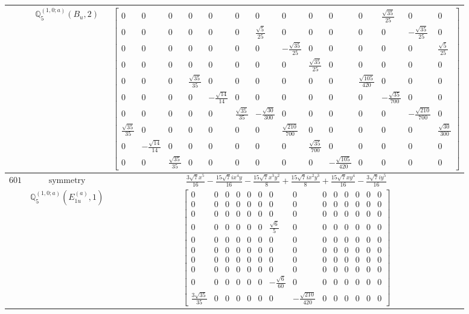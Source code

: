 \documentclass[fleqn,8pt,landscape]{jsarticle}
\begin{document}
\begin{longtable}{ccc}
$  $ & $ \mathbb{Q}_{5}^{(1,0;a)}(B_{u},2) $ & $ \begin{bmatrix} 0 & 0 & 0 & 0 & 0 & 0 & 0 & 0 & 0 & 0 & 0 & \frac{\sqrt{35}}{25} & 0 & 0 \\ 0 & 0 & 0 & 0 & 0 & 0 & \frac{\sqrt{5}}{25} & 0 & 0 & 0 & 0 & 0 & - \frac{\sqrt{35}}{25} & 0 \\ 0 & 0 & 0 & 0 & 0 & 0 & 0 & - \frac{\sqrt{35}}{25} & 0 & 0 & 0 & 0 & 0 & \frac{\sqrt{5}}{25} \\ 0 & 0 & 0 & 0 & 0 & 0 & 0 & 0 & \frac{\sqrt{35}}{25} & 0 & 0 & 0 & 0 & 0 \\ 0 & 0 & 0 & \frac{\sqrt{35}}{35} & 0 & 0 & 0 & 0 & 0 & 0 & \frac{\sqrt{105}}{420} & 0 & 0 & 0 \\ 0 & 0 & 0 & 0 & - \frac{\sqrt{14}}{14} & 0 & 0 & 0 & 0 & 0 & 0 & - \frac{\sqrt{35}}{700} & 0 & 0 \\ 0 & 0 & 0 & 0 & 0 & \frac{\sqrt{35}}{35} & - \frac{\sqrt{30}}{300} & 0 & 0 & 0 & 0 & 0 & - \frac{\sqrt{210}}{700} & 0 \\ \frac{\sqrt{35}}{35} & 0 & 0 & 0 & 0 & 0 & 0 & \frac{\sqrt{210}}{700} & 0 & 0 & 0 & 0 & 0 & \frac{\sqrt{30}}{300} \\ 0 & - \frac{\sqrt{14}}{14} & 0 & 0 & 0 & 0 & 0 & 0 & \frac{\sqrt{35}}{700} & 0 & 0 & 0 & 0 & 0 \\ 0 & 0 & \frac{\sqrt{35}}{35} & 0 & 0 & 0 & 0 & 0 & 0 & - \frac{\sqrt{105}}{420} & 0 & 0 & 0 & 0 \end{bmatrix} $ \\ \hline
$ 601 $ & $ \text{symmetry} $ & $ \frac{3 \sqrt{7} x^{5}}{16} - \frac{15 \sqrt{7} i x^{4} y}{16} - \frac{15 \sqrt{7} x^{3} y^{2}}{8} + \frac{15 \sqrt{7} i x^{2} y^{3}}{8} + \frac{15 \sqrt{7} x y^{4}}{16} - \frac{3 \sqrt{7} i y^{5}}{16} $ \\
$  $ & $ \mathbb{Q}_{5}^{(1,0;a)}(E_{1u}^{(a)},1) $ & $ \begin{bmatrix} 0 & 0 & 0 & 0 & 0 & 0 & 0 & 0 & 0 & 0 & 0 & 0 & 0 & 0 \\ 0 & 0 & 0 & 0 & 0 & 0 & 0 & 0 & 0 & 0 & 0 & 0 & 0 & 0 \\ 0 & 0 & 0 & 0 & 0 & 0 & 0 & 0 & 0 & 0 & 0 & 0 & 0 & 0 \\ 0 & 0 & 0 & 0 & 0 & 0 & \frac{\sqrt{6}}{5} & 0 & 0 & 0 & 0 & 0 & 0 & 0 \\ 0 & 0 & 0 & 0 & 0 & 0 & 0 & 0 & 0 & 0 & 0 & 0 & 0 & 0 \\ 0 & 0 & 0 & 0 & 0 & 0 & 0 & 0 & 0 & 0 & 0 & 0 & 0 & 0 \\ 0 & 0 & 0 & 0 & 0 & 0 & 0 & 0 & 0 & 0 & 0 & 0 & 0 & 0 \\ 0 & 0 & 0 & 0 & 0 & 0 & 0 & 0 & 0 & 0 & 0 & 0 & 0 & 0 \\ 0 & 0 & 0 & 0 & 0 & 0 & - \frac{\sqrt{6}}{60} & 0 & 0 & 0 & 0 & 0 & 0 & 0 \\ \frac{3 \sqrt{35}}{35} & 0 & 0 & 0 & 0 & 0 & 0 & - \frac{\sqrt{210}}{420} & 0 & 0 & 0 & 0 & 0 & 0 \end{bmatrix} $ \\ \hline

\end{longtable}
\end{document}
